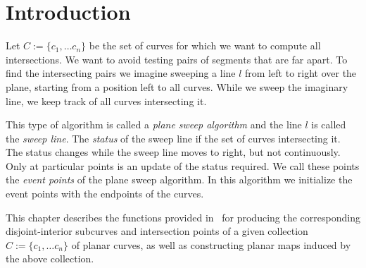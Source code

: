 \section{Introduction}

Let $C:=\{c_1, \ldots c_n\}$ be the set of curves for which we want 
to compute all intersections. We want to avoid testing pairs of segments 
that are far apart. To find the intersecting pairs we imagine sweeping  
a line $l$ from left to right over the plane, starting from a position 
left to all curves. While we sweep the imaginary line, we keep track of all 
curves intersecting it.

This type of algorithm is called a {\em plane sweep algorithm} and the line 
$l$ is called the {\em sweep line}. The {\em status} of the sweep line if 
the set of curves intersecting it. The status changes while the sweep line 
moves to right, but not continuously. Only at particular points is an update of the status required. We call these points the {\em event points} of the 
plane sweep algorithm. In this algorithm we initialize the event points with 
the endpoints of the curves.


This chapter describes the functions provided in
\cgal\ for producing the corresponding disjoint-interior 
subcurves and intersection points of a given collection 
$C:=\{c_1, \ldots c_n\}$ of planar curves, 
as well as constructing planar maps induced by the above 
collection.
